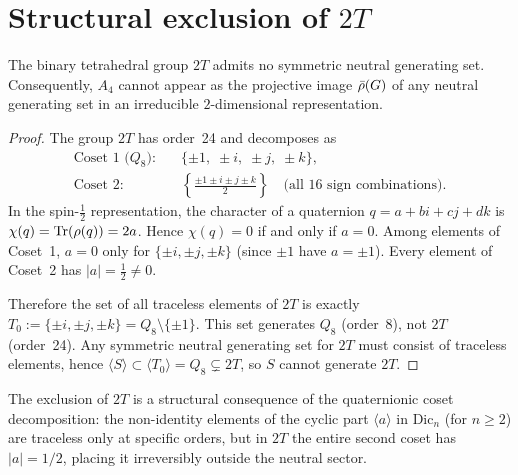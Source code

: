 \section{Structural exclusion of $2T$}
  \label{sec:2T}

  \begin{proposition}[Exclusion of $2T$]
    \label{prop:2T-excluded}
    The binary tetrahedral group $2T$ admits no symmetric neutral generating set.
    Consequently, $A_4$ cannot appear as the projective image $\bar{\rho}(G)$
    of any neutral generating set in an irreducible $2$-dimensional representation.
  \end{proposition}

  \begin{proof}
    The group $2T$ has order~24 and decomposes as
    \begin{align}
      \text{Coset~1 (}Q_8\text{):}\quad
      &\{\pm 1,\; \pm i,\; \pm j,\; \pm k\},
      \label{eq:2T-Q8} \\
      \text{Coset~2:}\quad
      &\left\{\tfrac{\pm 1 \pm i \pm j \pm k}{2}\right\}
      \quad \text{(all $16$ sign combinations)}.
      \label{eq:2T-coset2}
    \end{align}
    In the spin-$\tfrac{1}{2}$ representation, the character of a quaternion
    $q = a + bi + cj + dk$ is $\chi(q) = \mathrm{Tr}(\rho(q)) = 2a$.
    Hence $\chi(q) = 0$ if and only if $a = 0$.
    Among elements of Coset~1, $a = 0$ only for $\{\pm i, \pm j, \pm k\}$
    (since $\pm 1$ have $a = \pm 1$).
    Every element of Coset~2 has $|a| = \tfrac{1}{2} \neq 0$.

    Therefore the set of all traceless elements of $2T$ is exactly
    $T_0 := \{\pm i, \pm j, \pm k\} = Q_8 \setminus \{\pm 1\}$.
    This set generates $Q_8$ (order~8), not $2T$ (order~24).
    Any symmetric neutral generating set for $2T$ must consist of traceless
    elements, hence $\langle S \rangle \subset \langle T_0 \rangle = Q_8 \subsetneq 2T$,
    so $S$ cannot generate $2T$.
  \end{proof}

  \begin{remark}
    The exclusion of $2T$ is a structural consequence of the quaternionic
    coset decomposition: the non-identity elements of the cyclic part $\langle a \rangle$
    in $\mathrm{Dic}_n$ (for $n \ge 2$) are traceless only at specific orders, but
    in $2T$ the entire second coset has $|a| = 1/2$, placing it irreversibly outside
    the neutral sector.
  \end{remark}
